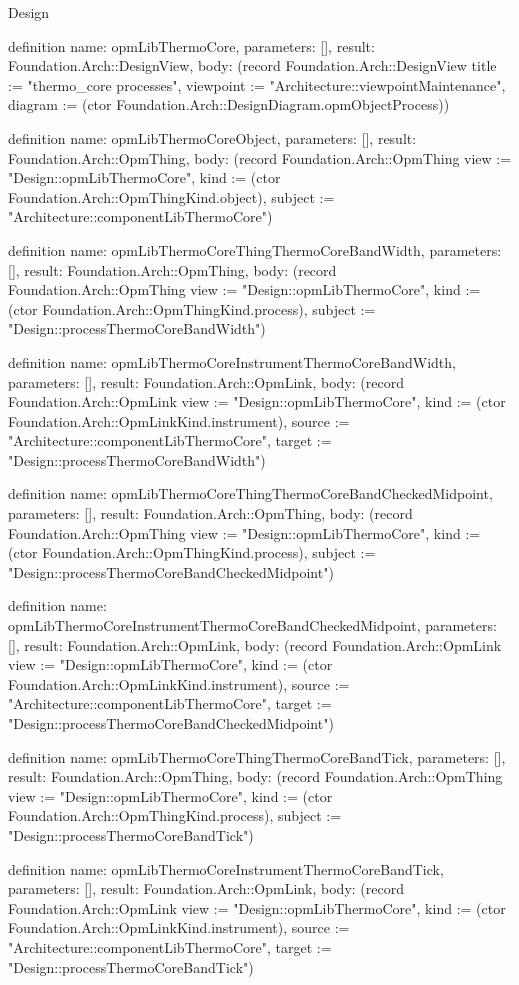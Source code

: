 \begin{lexlean}{Design}
\begin{semanticmodule}
definition{
  name: opmLibThermoCore,
  parameters: [],
  result: Foundation.Arch::DesignView,
  body: (record Foundation.Arch::DesignView {title := "thermo_core processes", viewpoint := "Architecture::viewpointMaintenance", diagram := (ctor Foundation.Arch::DesignDiagram.opmObjectProcess)})
}

definition{
  name: opmLibThermoCoreObject,
  parameters: [],
  result: Foundation.Arch::OpmThing,
  body: (record Foundation.Arch::OpmThing {view := "Design::opmLibThermoCore", kind := (ctor Foundation.Arch::OpmThingKind.object), subject := "Architecture::componentLibThermoCore"})
}

definition{
  name: opmLibThermoCoreThingThermoCoreBandWidth,
  parameters: [],
  result: Foundation.Arch::OpmThing,
  body: (record Foundation.Arch::OpmThing {view := "Design::opmLibThermoCore", kind := (ctor Foundation.Arch::OpmThingKind.process), subject := "Design::processThermoCoreBandWidth"})
}

definition{
  name: opmLibThermoCoreInstrumentThermoCoreBandWidth,
  parameters: [],
  result: Foundation.Arch::OpmLink,
  body: (record Foundation.Arch::OpmLink {view := "Design::opmLibThermoCore", kind := (ctor Foundation.Arch::OpmLinkKind.instrument), source := "Architecture::componentLibThermoCore", target := "Design::processThermoCoreBandWidth"})
}

definition{
  name: opmLibThermoCoreThingThermoCoreBandCheckedMidpoint,
  parameters: [],
  result: Foundation.Arch::OpmThing,
  body: (record Foundation.Arch::OpmThing {view := "Design::opmLibThermoCore", kind := (ctor Foundation.Arch::OpmThingKind.process), subject := "Design::processThermoCoreBandCheckedMidpoint"})
}

definition{
  name: opmLibThermoCoreInstrumentThermoCoreBandCheckedMidpoint,
  parameters: [],
  result: Foundation.Arch::OpmLink,
  body: (record Foundation.Arch::OpmLink {view := "Design::opmLibThermoCore", kind := (ctor Foundation.Arch::OpmLinkKind.instrument), source := "Architecture::componentLibThermoCore", target := "Design::processThermoCoreBandCheckedMidpoint"})
}

definition{
  name: opmLibThermoCoreThingThermoCoreBandTick,
  parameters: [],
  result: Foundation.Arch::OpmThing,
  body: (record Foundation.Arch::OpmThing {view := "Design::opmLibThermoCore", kind := (ctor Foundation.Arch::OpmThingKind.process), subject := "Design::processThermoCoreBandTick"})
}

definition{
  name: opmLibThermoCoreInstrumentThermoCoreBandTick,
  parameters: [],
  result: Foundation.Arch::OpmLink,
  body: (record Foundation.Arch::OpmLink {view := "Design::opmLibThermoCore", kind := (ctor Foundation.Arch::OpmLinkKind.instrument), source := "Architecture::componentLibThermoCore", target := "Design::processThermoCoreBandTick"})
}


\end{semanticmodule}
\end{lexlean}
